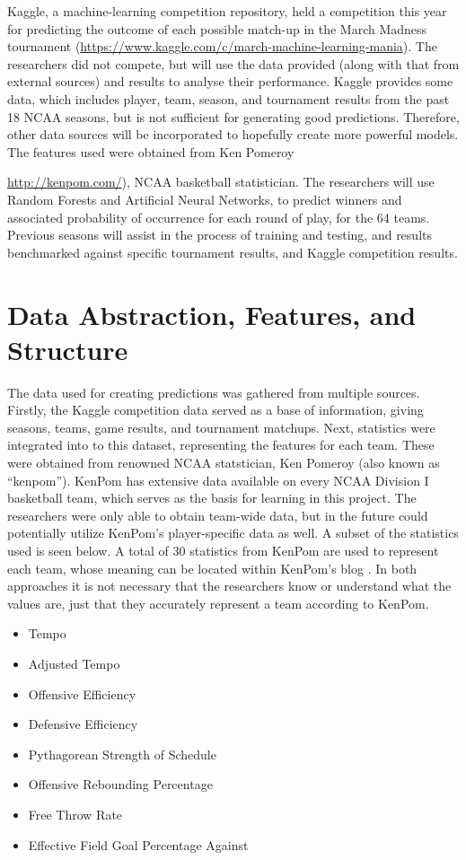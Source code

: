 \documentclass[conference]{IEEEtran}
\begin{document}
Kaggle, a machine-learning competition repository, held a competition this year for predicting the outcome of each possible match-up in the March Madness tournament (\url{https://www.kaggle.com/c/march-machine-learning-mania}).
The researchers did not compete, but will use the data provided (along with that from external sources) and results to analyse their performance.
Kaggle provides some data, which includes player, team, season, and tournament results from the past 18 NCAA seasons, but is not sufficient for generating good predictions.
Therefore, other data sources will be incorporated to hopefully create more powerful models. The features used were obtained from Ken Pomeroy {\url{http://kenpom.com/}), NCAA basketball statistician.
The researchers will use Random Forests and Artificial Neural Networks, to predict winners and associated probability of occurrence for each round of play, for the 64 teams.
Previous seasons will assist in the process of training and testing, and results benchmarked against specific tournament results, and Kaggle competition results.

\section{Data Abstraction, Features, and Structure}
The data used for creating predictions was gathered from multiple sources. Firstly, the Kaggle competition data served as a base of information, giving seasons, teams, game results, and tournament matchups.
Next, statistics were integrated into to this dataset, representing the features for each team. 
These were obtained from renowned NCAA statstician, Ken Pomeroy (also known as ``kenpom'').
KenPom has extensive data available on every NCAA Division I basketball team, which serves as the basis for learning in this project.
The researchers were only able to obtain team-wide data, but in the future could potentially utilize KenPom's player-specific data as well. 
A subset of the statistics used is seen below. 
A total of 30 statistics from KenPom are used to represent each team, whose meaning can be located within KenPom's blog \cite{KenPom}. 
In both approaches it is not necessary that the researchers know or understand what the values are, just that they accurately represent a team according to KenPom.

\begin{itemize}
  \item Tempo
  \item Adjusted Tempo
  \item Offensive Efficiency
  \item Defensive Efficiency
  \item Pythagorean Strength of Schedule
  \item Offensive Rebounding Percentage
  \item Free Throw Rate
  \item Effective Field Goal Percentage Against
\end{itemize}

}
\end{document}
